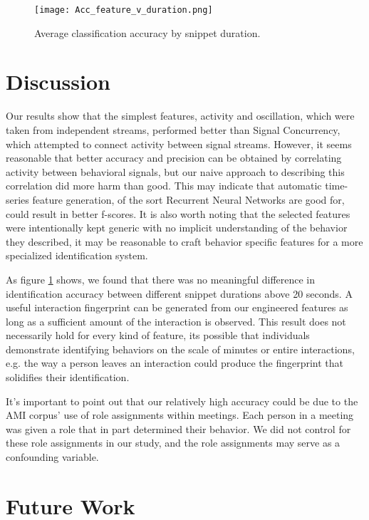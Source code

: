 \documentclass[conference]{IEEEtran}
\begin{document}
\begin{figure}[h]
    \caption{Average classification accuracy by snippet duration.}
    \centering
    \texttt{[image: Acc\_feature\_v\_duration.png]}
    \label{acc_snippet}
\end{figure}

\section{Discussion}

Our results show that the simplest features, activity and oscillation, which were taken from independent streams, performed better than Signal Concurrency, which attempted to connect activity between signal streams. However, it seems reasonable that better accuracy and precision can be obtained by correlating activity between behavioral signals, but our naive approach to describing this correlation did more harm than good. This may indicate that automatic time-series feature generation, of the sort Recurrent Neural Networks are good for, could result in better f-scores. It is also worth noting that the selected features were intentionally kept generic with no implicit understanding of the behavior they described, it may be reasonable to craft behavior specific features for a more specialized identification system. 

As figure \ref{acc_snippet} shows, we found that there was no meaningful difference in identification accuracy between different snippet durations above 20 seconds. A useful interaction fingerprint can be generated from our engineered features as long as a sufficient amount of the interaction is observed. This result does not necessarily hold for every kind of feature, its possible that individuals demonstrate identifying behaviors on the scale of minutes or entire interactions, e.g. the way a person leaves an interaction could produce the fingerprint that solidifies their identification. 

It's important to point out that our relatively high accuracy could be due to the AMI corpus' use of role assignments within meetings. Each person in a meeting was given a role that in part determined their behavior. We did not control for these role assignments in our study, and the role assignments may serve as a confounding variable. 

\section{Future Work}
\end{document}
